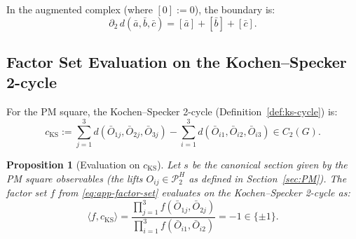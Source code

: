 \documentclass[11pt]{article}
\newtheorem{proposition}[theorem]{Proposition}
\begin{document}
In the augmented complex (where $[0] := 0$), the boundary is:
\[
  \partial_2 \, d(\bar{a}, \bar{b}, \bar{c}) = [\bar{a}] + [\bar{b}] + [\bar{c}].
\]

\subsection{Factor Set Evaluation on the Kochen--Specker 2-cycle}

For the PM square, the Kochen--Specker 2-cycle (Definition~\ref{def:ks-cycle}) is:
\[
  c_{\mathrm{KS}} := \sum_{j=1}^3 d(\bar{O}_{1j}, \bar{O}_{2j}, \bar{O}_{3j})
  - \sum_{i=1}^3 d(\bar{O}_{i1}, \bar{O}_{i2}, \bar{O}_{i3}) \in C_2(G).
\]

\begin{proposition}[Evaluation on $c_{\mathrm{KS}}$]
\label{prop:cks-eval}
Let $s$ be the canonical section given by the PM square observables
(the lifts $O_{ij} \in \mathcal{P}_2^H$ as defined in Section~\ref{sec:PM}).
The factor set $f$ from \eqref{eq:app-factor-set} evaluates on the
Kochen--Specker 2-cycle as:
\[
  \langle f, c_{\mathrm{KS}} \rangle
  = \frac{\prod_{j=1}^3 f(\bar{O}_{1j}, \bar{O}_{2j})}{\prod_{i=1}^3 f(\bar{O}_{i1}, \bar{O}_{i2})}
  = -1 \in \{\pm 1\}.
\]
\end{proposition}
\end{document}
